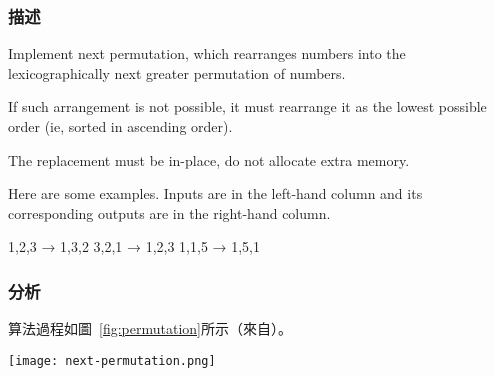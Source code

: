 \subsubsection{描述}
Implement next permutation, which rearranges numbers into the lexicographically next greater permutation of numbers.

If such arrangement is not possible, it must rearrange it as the lowest possible order (ie, sorted in ascending order).

The replacement must be in-place, do not allocate extra memory.

Here are some examples. Inputs are in the left-hand column and its corresponding outputs are in the right-hand column.
\begin{Code}
1,2,3 → 1,3,2
3,2,1 → 1,2,3
1,1,5 → 1,5,1
\end{Code}


\subsubsection{分析}
算法過程如圖~\ref{fig:permutation}所示（來自）。

\begin{center}
\texttt{[image: next-permutation.png]}\\
\label{fig:permutation}
\end{center}


